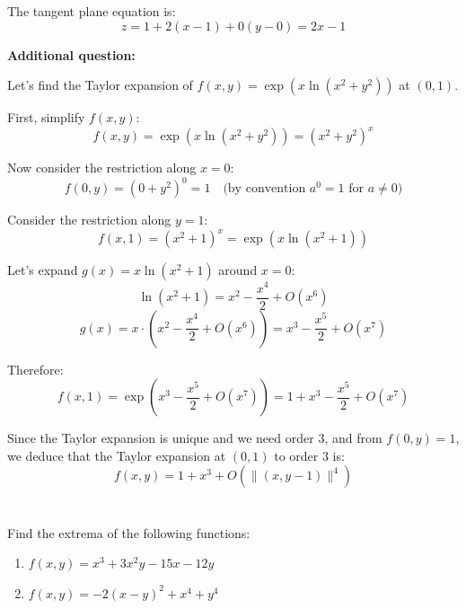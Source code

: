 \documentclass[12pt]{article}
\begin{document}
\begin{correctionbox}
The tangent plane equation is:
$$z = 1 + 2(x - 1) + 0(y - 0) = 2x - 1$$

\textbf{Additional question:}

Let's find the Taylor expansion of $f(x, y) = \exp(x \ln(x^2 + y^2))$ at $(0,1)$.

First, simplify $f(x, y)$:
$$f(x, y) = \exp(x \ln(x^2 + y^2)) = (x^2 + y^2)^x$$

Now consider the restriction along $x = 0$:
$$f(0, y) = (0 + y^2)^0 = 1 \quad \text{(by convention $a^0 = 1$ for $a \neq 0$)}$$

Consider the restriction along $y = 1$:
$$f(x, 1) = (x^2 + 1)^x = \exp(x \ln(x^2 + 1))$$

Let's expand $g(x) = x \ln(x^2 + 1)$ around $x = 0$:
$$\ln(x^2 + 1) = x^2 - \frac{x^4}{2} + O(x^6)$$
$$g(x) = x \cdot \left(x^2 - \frac{x^4}{2} + O(x^6)\right) = x^3 - \frac{x^5}{2} + O(x^7)$$

Therefore:
$$f(x, 1) = \exp\left(x^3 - \frac{x^5}{2} + O(x^7)\right) = 1 + x^3 - \frac{x^5}{2} + O(x^7)$$

Since the Taylor expansion is unique and we need order 3, and from $f(0, y) = 1$, we deduce that the Taylor expansion at $(0,1)$ to order 3 is:
$$f(x, y) = 1 + x^3 + O(\|(x, y - 1)\|^4)$$
\end{correctionbox}

\section{}
Find the extrema of the following functions:

\begin{enumerate}
    \item $f(x, y) = x^3 + 3x^2y - 15x - 12y$
    \item $f(x, y) = -2(x - y)^2 + x^4 + y^4$
\end{enumerate}
\end{document}
